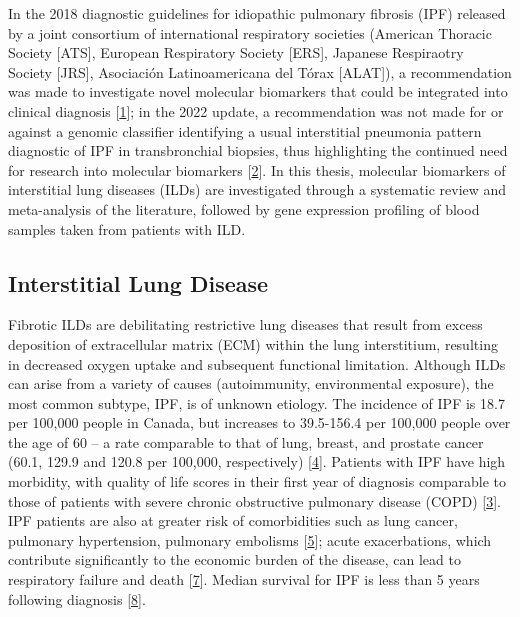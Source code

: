 \documentclass[
]{article}
\begin{document}
In the 2018 diagnostic guidelines for idiopathic pulmonary fibrosis (IPF) released by a joint consortium of international respiratory societies (American Thoracic Society {[}ATS{]}, European Respiratory Society {[}ERS{]}, Japanese Respiraotry Society {[}JRS{]}, Asociación Latinoamericana del Tórax {[}ALAT{]}), a recommendation was made to investigate novel molecular biomarkers that could be integrated into clinical diagnosis {[}\protect\hyperlink{ref-raghu_diagnosis_2018}{1}{]}; in the 2022 update, a recommendation was not made for or against a genomic classifier identifying a usual interstitial pneumonia pattern diagnostic of IPF in transbronchial biopsies, thus highlighting the continued need for research into molecular biomarkers {[}\protect\hyperlink{ref-raghu_idiopathic_2022}{2}{]}. In this thesis, molecular biomarkers of interstitial lung diseases (ILDs) are investigated through a systematic review and meta-analysis of the literature, followed by gene expression profiling of blood samples taken from patients with ILD.

\hypertarget{interstitial-lung-disease}{%
\subsection{Interstitial Lung Disease}\label{interstitial-lung-disease}}

Fibrotic ILDs are debilitating restrictive lung diseases that result from excess deposition of extracellular matrix (ECM) within the lung interstitium, resulting in decreased oxygen uptake and subsequent functional limitation. Although ILDs can arise from a variety of causes (autoimmunity, environmental exposure), the most common subtype, IPF, is of unknown etiology. The incidence of IPF is 18.7 per 100,000 people in Canada, but increases to 39.5-156.4 per 100,000 people over the age of 60 -- a rate comparable to that of lung, breast, and prostate cancer (60.1, 129.9 and 120.8 per 100,000, respectively) {[}\protect\hyperlink{ref-canadian_cancer_statistics_advisory_committee_in_collaboration_with_the_canadian_cancer_society_statistics_canada_and_the_public_health_agency_of_canada_canadian_2023}{4}{]}. Patients with IPF have high morbidity, with quality of life scores in their first year of diagnosis comparable to those of patients with severe chronic obstructive pulmonary disease (COPD) {[}\protect\hyperlink{ref-hopkins_epidemiology_2016}{3}{]}. IPF patients are also at greater risk of comorbidities such as lung cancer, pulmonary hypertension, pulmonary embolisms {[}\protect\hyperlink{ref-raghu_comorbidities_2015}{5}{]}; acute exacerbations, which contribute significantly to the economic burden of the disease, can lead to respiratory failure and death {[}\protect\hyperlink{ref-hilberg_economic_2018}{7}{]}. Median survival for IPF is less than 5 years following diagnosis {[}\protect\hyperlink{ref-ley_clinical_2011}{8}{]}.
\end{document}
